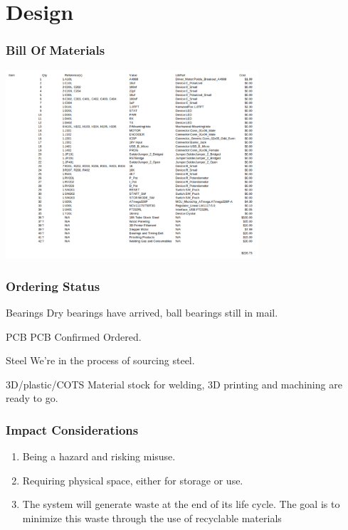 \documentclass[aspectratio=169]{beamer}
\begin{document}
\section{Design}
\begin{frame}
    \frametitle{Bill Of Materials}

    \includegraphics[height=7cm]{BOMTable}

\end{frame}

\begin{frame}
    \frametitle{Ordering Status}

    \begin{block}{Bearings}
        Dry bearings have arrived, ball bearings still in mail.
    \end{block}

    \begin{block}{PCB}
        PCB Confirmed Ordered.
    \end{block}

    \begin{block}{Steel}
        We're in the process of sourcing steel.
    \end{block}

    \begin{block}{3D/plastic/COTS}
        Material stock for welding, 3D printing and machining are ready to go.
    \end{block}

\end{frame}


\begin{frame}
    \frametitle{Impact Considerations}

    \begin{enumerate}
        \item Being a hazard and risking misuse.
        \item Requiring physical space, either for storage or use.
        \item The system will generate waste at the end of its life cycle. The goal is to minimize this waste through the use of recyclable materials
    \end{enumerate}

\end{frame}
\end{document}

